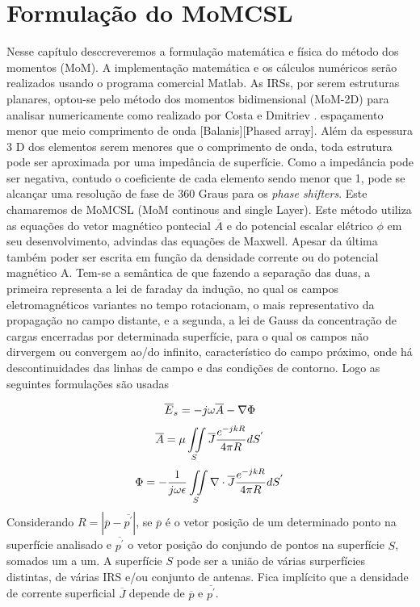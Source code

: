 \documentclass[
	12pt,				%
	openright,			%
	oneside,			%
	a4paper,			%
	english,			%
	brazil				%
	]{abntex2}
\begin{document}
\chapter{Formulação do MoMCSL}\label{FormulaçãoMoMCSL}


Nesse capítulo desccreveremos a formulação matemática e física do método dos momentos (MoM). A implementação matemática e os cálculos numéricos serão realizados usando o programa comercial Matlab. As IRSs, por serem estruturas planares, optou-se pelo método dos momentos bidimensional (MoM-2D) para analisar numericamente como realizado por Costa e Dmitriev . 
espaçamento menor que meio comprimento de onda [Balanis][Phased array]. Além da espessura 3 D dos elementos serem menores que o comprimento de onda, toda estrutura pode ser aproximada por uma impedância de superfície. Como a impedância pode ser negativa, contudo o coeficiente de cada elemento sendo menor que 1, pode se alcançar uma resolução de fase de 360 Graus para os  \emph{phase shifters}. Este chamaremos de MoMCSL (MoM continous and single Layer). Este método utiliza as equações do vetor magnético pontecial $\overline{A}$ e do potencial escalar elétrico $\phi$ em seu desenvolvimento, advindas das equações de Maxwell. Apesar da última também poder ser escrita em função da densidade corrente ou do potencial magnético A. Tem-se a semântica de que fazendo a separação das duas, a primeira representa a lei de faraday da indução, no qual os campos eletromagnéticos variantes no tempo rotacionam, o mais representativo da propagação no campo distante, e a segunda, a lei de Gauss da concentração de cargas encerradas por determinada superfície, para o qual os campos não dirvergem ou convergem ao/do infinito, característico do campo próximo, onde há descontinuidades das linhas de campo e das condições de contorno. Logo as seguintes formulações são usadas


\begin{equation}{\label{CampoEspalhado}}
  \overline{E}_{s}=-j\omega \overline{A} - \nabla \Phi
\end{equation}
\begin{equation}{\label{VetorPotencialMagnetico}}
  \overline{A} =\mu \iint\limits_S\overline{J} \frac{e^{-j k R}}{4 \pi R} dS^{'}
  \end{equation}
\begin{equation}{\label{PotencialEscalar}}
  \Phi =-\frac{1}{j\omega \epsilon}\iint\limits_S \nabla \cdot \overline{J}\frac{e^{-j k R}}{4 \pi R} dS^{'}
  \end{equation}
Considerando $R=|\overline{p}-\overline{p^{'}}|$,  se $\overline{p}$ é o vetor posição de um determinado ponto na superfície  analisado e $\overline{p^{'}}$ o vetor posição do conjundo de pontos na superfície $S$, somados um a um. A superfície $S$ pode ser a união de várias surperfícies distintas, de várias IRS e/ou conjunto de antenas. Fica implícito que a densidade de corrente superficial $\overline{J}$ depende de $\overline{p}$ e $\overline{p^{'}}$. 
\end{document}
